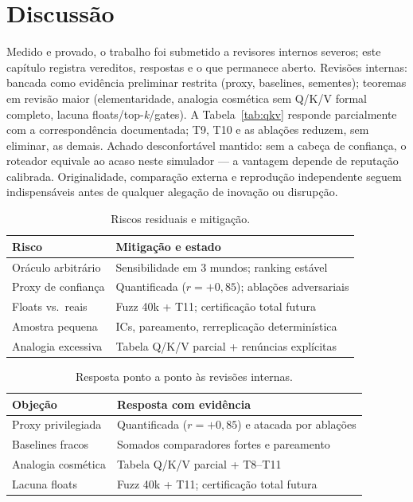 \chapter{Discussão}
Medido e provado, o trabalho foi submetido a revisores internos severos; este capítulo registra vereditos, respostas e o que permanece aberto.
Revisões internas: bancada como evidência preliminar restrita (proxy, baselines, sementes); teoremas em revisão maior (elementaridade, analogia cosmética sem Q/K/V formal completo, lacuna floats/top-\textit{k}/gates). A Tabela~\ref{tab:qkv} responde parcialmente com a correspondência documentada; T9, T10 e as ablações reduzem, sem eliminar, as demais. Achado desconfortável mantido: sem a cabeça de confiança, o roteador equivale ao acaso neste simulador --- a vantagem depende de reputação calibrada. Originalidade, comparação externa e reprodução independente seguem indispensáveis antes de qualquer alegação de inovação ou disrupção.
\begin{table}[h]
\centering
\caption{Riscos residuais e mitigação.}
\label{tab:riscos}
\begin{tabular}{ll}
\toprule
Risco & Mitigação e estado \\
\midrule
Oráculo arbitrário & Sensibilidade em 3 mundos; ranking estável \\
Proxy de confiança & Quantificada ($r=+0{,}85$); ablações adversariais \\
Floats vs.\ reais & Fuzz 40k + T11; certificação total futura \\
Amostra pequena & ICs, pareamento, rerreplicação determinística \\
Analogia excessiva & Tabela Q/K/V parcial + renúncias explícitas \\
\bottomrule
\end{tabular}
\end{table}
\begin{table}[h]
\centering
\caption{Resposta ponto a ponto às revisões internas.}
\label{tab:revisao}
\begin{tabular}{ll}
\toprule
Objeção & Resposta com evidência \\
\midrule
Proxy privilegiada & Quantificada ($r=+0{,}85$) e atacada por ablações \\
Baselines fracos & Somados comparadores fortes e pareamento \\
Analogia cosmética & Tabela Q/K/V parcial + T8--T11 \\
Lacuna floats & Fuzz 40k + T11; certificação total futura \\
\bottomrule
\end{tabular}
\end{table}
